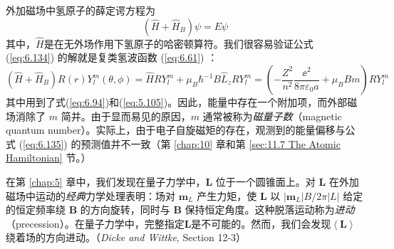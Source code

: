     外加磁场中氢原子的薛定谔方程为
    \begin{equation}
        \left(\hat{H}+\hat{H}_B\right)\psi = E\psi
        \label{eq:6.134}
    \end{equation}
    其中，$\hat{H}$是在无外场作用下氢原子的哈密顿算符。我们很容易验证公式 (\ref{eq:6.134}) 的解就是复类氢波函数 (\ref{eq:6.61}) ：
    \begin{equation}
        \left(\hat{H}+\hat{H}_B\right)R\left(r\right)Y_l^m\left(\theta,\phi\right) = \hat{H}RY_l^m + \mu_B\hbar^{-1}B\hat{L}_zRY_l^m = \left(-\frac{Z^2}{n^2}\frac{\ee ^2}{8\pi\varepsilon_0a}+\mu_BBm\right)RY_l^m
        \label{eq:6.135}
    \end{equation}
    其中用到了式(\ref{eq:6.94})和(\ref{eq:5.105})。因此，能量中存在一个附加项，而外部磁场消除了 $m$ 简并。由于显而易见的原因，$m$ 通常被称为\textit{磁量子数}（magnetic quantum number）。实际上，由于电子自旋磁矩的存在，观测到的能量偏移与公式 (\ref{eq:6.135}) 的预测值并不一致（第 \ref{chap:10} 章和第 \ref{sec:11.7 The Atomic Hamiltonian} 节。）

    在第 \ref{chap:5} 章中，我们发现在量子力学中，$\mathbf{L}$ 位于一个圆锥面上。对 $\mathbf{L}$ 在外加磁场中运动的\textit{经典}力学处理表明：场对 $\mathbf{m}_L$ 产生力矩，使 $\mathbf{L}$ 以 $\left|\mathbf{m}_L\right|B/2\pi \left|L\right|$ 给定的恒定频率绕 $\mathbf{B}$ 的方向旋转，同时与 $\mathbf{B}$ 保持恒定角度。这种脱落运动称为\textit{进动}（precession）。在量子力学中，完整指定$\mathbf{L}$是不可能的。然而，我们会发现$\left\langle \mathbf{L} \right\rangle$绕着场的方向进动。（\textit{Dicke and Wittke}, Section 12-3）

